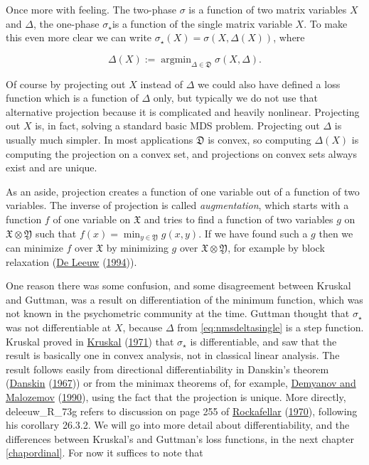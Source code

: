\documentclass[
  12pt,
]{book}
\theoremstyle{definition}
\theoremstyle{definition}
\theoremstyle{definition}
\theoremstyle{definition}
\theoremstyle{remark}
\begin{document}
Once more with feeling. The two-phase \(\sigma\) is a function of two matrix variables
\(X\) and \(\Delta\), the one-phase \(\sigma_\star\)is a function of the single matrix variable \(X\). To make this even more clear we can write \(\sigma_\star(X)=\sigma(X,\Delta(X))\), where

\begin{equation}
\Delta(X):=\mathop{\text{argmin}}_{\Delta\in\mathfrak{D}}\sigma(X,\Delta).
\label{eq:nmsdeltasingle}
\end{equation}

Of course by projecting out \(X\) instead of \(\Delta\) we could also have defined a loss function which is a function of \(\Delta\) only, but typically we do not use that alternative projection because it is complicated and heavily nonlinear. Projecting out \(X\) is, in fact, solving a standard basic MDS problem.
Projecting out \(\Delta\) is usually much simpler. In most applications \(\mathfrak{D}\) is convex, so computing \(\Delta(X)\) is computing the projection on a convex set, and projections on convex sets always exist and are unique.

As an aside, projection creates a function of one variable out of a function of
two variables. The inverse of projection is called \emph{augmentation}, which starts with a function \(f\) of one variable on \(\mathfrak{X}\) and tries to find a function of two variables \(g\) on \(\mathfrak{X}\otimes\mathfrak{Y}\) such that
\(f(x)=\min_{y\in\mathfrak{Y}} g(x,y)\). If we have found such a \(g\) then we can
minimize \(f\) over \(\mathfrak{X}\) by minimizing \(g\) over \(\mathfrak{X}\otimes\mathfrak{Y}\), for example by block relaxation (\protect\hyperlink{ref-deleeuw_C_94c}{De Leeuw} (\protect\hyperlink{ref-deleeuw_C_94c}{1994})).

One reason there was some confusion, and some disagreement between Kruskal and Guttman,
was a result on differentiation of the minimum function, which was not known in the
psychometric community at the time. Guttman thought that \(\sigma_\star\) was not differentiable at \(X\), because \(\Delta\) from \eqref{eq:nmsdeltasingle} is a step function. Kruskal proved in \protect\hyperlink{ref-kruskal_71}{Kruskal} (\protect\hyperlink{ref-kruskal_71}{1971}) that \(\sigma_\star\) is differentiable, and saw that the result is basically one in convex analysis, not in classical linear analysis.
The result follows easily from directional differentiability in Danskin's theorem (\protect\hyperlink{ref-danskin_67}{Danskin} (\protect\hyperlink{ref-danskin_67}{1967})) or from the minimax theorems of, for example, \protect\hyperlink{ref-demyanov_malozemov_90}{Demyanov and Malozemov} (\protect\hyperlink{ref-demyanov_malozemov_90}{1990}), using the fact that the projection is unique. More directly, deleeuw\_R\_73g refers to discussion on page 255 of \protect\hyperlink{ref-rockafellar_70}{Rockafellar} (\protect\hyperlink{ref-rockafellar_70}{1970}), following his corollary 26.3.2.
We will go into more detail about differentiability, and the differences between Kruskal's and Guttman's loss functions, in the next chapter \ref{chapordinal}.
For now it suffices to note that
\end{document}
